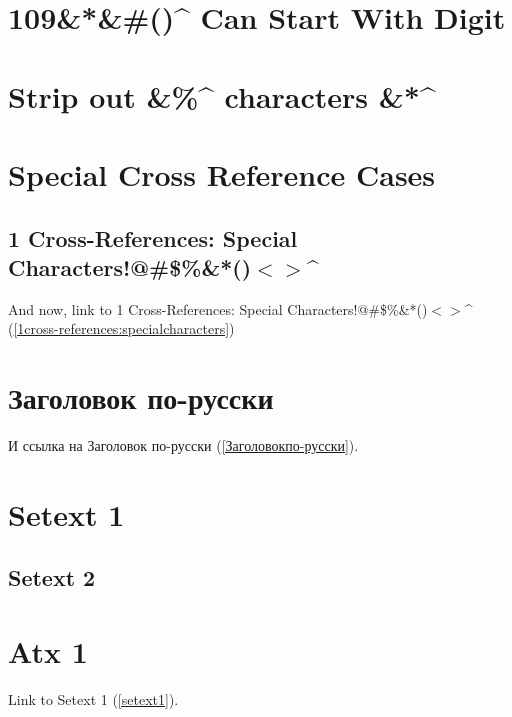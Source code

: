 
\def\mytitle{MultiMarkdown Autoreference Test}


\chapter{109\&*\&\#()\^{} Can Start With Digit}
\label{109canstartwithdigit}

\chapter{Strip out \&\%\^{} characters \&*\^{}}
\label{stripoutcharacters}

\chapter{Special Cross Reference Cases}
\label{specialcrossreferencecases}

\section{1 Cross-References: Special Characters!@\#\$\%\&*()$<$$>$\^{}}
\label{1cross-references:specialcharacters}

And now, link to 1 Cross-References: Special Characters!@\#\$\%\&*()$<$$>$\^{} (\autoref{1cross-references:specialcharacters})

\chapter{Заголовок по-русски}
\label{Заголовокпо-русски}

И ссылка на Заголовок по-русски (\autoref{Заголовокпо-русски}).

\chapter{Setext 1}
\label{setext1}

\section{Setext 2}
\label{setext2}

\chapter{Atx 1}
\label{atx1}

Link to Setext 1 (\autoref{setext1}).

